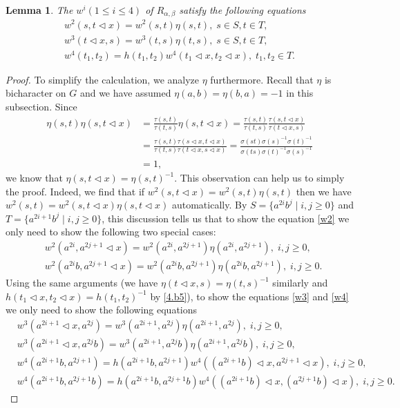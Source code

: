\documentclass[a4paper,11pt]{amsart}
\numberwithin{equation}{section}
\newtheorem{lemma}[theorem]{Lemma}
\begin{document}
\begin{lemma}\label{lemm4.3}
The $w^i (1\leq i \leq4)$ of $R_{\alpha,\beta}$ satisfy the following equations
\begin{gather}
\label{w2} w^2(s,t\triangleleft x)=w^2(s,t)\eta(s,t),\; s \in S,t\in T,\\
\label{w3} w^3(t\triangleleft x,s)=w^3(t,s)\eta(t,s),\;s \in S,t\in T,\\
\label{w4} w^4(t_1,t_2)=h(t_1,t_2)w^4(t_1 \triangleleft x,t_2 \triangleleft x),\;t_1,t_2 \in T.
\end{gather}
\end{lemma}
\begin{proof}
To simplify the calculation, we analyze $\eta$ furthermore. Recall that $\eta$ is bicharacter on $G$ and we have assumed $\eta(a,b)=\eta(b,a)=-1$ in this subsection. Since
\begin{align*}
\eta(s,t)\eta(s,t\triangleleft x)&=\frac{\tau(s,t)}{\tau(t,s)}\eta(s,t\triangleleft x)=\frac{\tau(s,t)}{\tau(t,s)} \frac{\tau(s,t\triangleleft x)}{\tau(t\triangleleft x,s)}\\
&=\frac{\tau(s,t) \tau(s\triangleleft x,t\triangleleft x)}{\tau(t,s) \tau(t\triangleleft x,s \triangleleft x)}=\frac{\sigma(st) \sigma(s)^{-1} \sigma(t)^{-1}}{\sigma(ts) \sigma(t)^{-1} \sigma(s)^{-1}}\\
&=1,
\end{align*}
we know that $\eta(s,t\triangleleft x)=\eta(s,t)^{-1}$.
This observation can help us to simply the proof. Indeed, we find that if $w^2(s,t\triangleleft x)=w^2(s,t)\eta(s,t)$ then we have $w^2(s,t)=w^2(s,t\triangleleft x)\eta(s,t\triangleleft x)$ automatically. By $S=\{a^{2i}b^j\;|\;i,j\geq 0\}$ and $T=\{a^{2i+1}b^j\;|\;i,j\geq 0\}$, this discussion tells us that to show the equation \eqref{w2} we only need to show the following two special cases:
\begin{align}
\label{w2.1} &w^2(a^{2i},a^{2j+1}\triangleleft x)=w^2(a^{2i},a^{2j+1})\eta(a^{2i},a^{2j+1}),\; i,j\geq 0,\\
\label{w2.2} &w^2(a^{2i}b,a^{2j+1}\triangleleft x)=w^2(a^{2i}b,a^{2j+1})\eta(a^{2i}b,a^{2j+1}),\; i,j\geq 0.
\end{align} Using the same arguments (we have $\eta(t\triangleleft x,s)=\eta(t,s)^{-1}$ similarly and $h(t_1\triangleleft x, t_2\triangleleft x)=h(t_1,t_2)^{-1}$ by \eqref{4.b5}), to show the equations \eqref{w3} and \eqref{w4} we only need to show the following equations
\begin{align}
\label{w3.1} &w^3(a^{2i+1}\triangleleft x,a^{2j})=w^3(a^{2i+1},a^{2j})\eta(a^{2i+1},a^{2j}),\;i,j\geq 0,\\
\label{w3.2} &w^3(a^{2i+1}\triangleleft x,a^{2j}b)=w^3(a^{2i+1},a^{2j}b)\eta(a^{2i+1},a^{2j}b),\;i,j\geq 0,\\
\label{w4.1} &w^4(a^{2i+1}b,a^{2j+1})=h(a^{2i+1}b,a^{2j+1})w^4((a^{2i+1}b) \triangleleft x,a^{2j+1} \triangleleft x),\;i,j\geq 0,\\
\label{w4.2} &w^4(a^{2i+1}b,a^{2j+1}b)=h(a^{2i+1}b,a^{2j+1}b)w^4((a^{2i+1}b) \triangleleft x,(a^{2j+1}b) \triangleleft x),\;i,j\geq 0.
\end{align}


\end{proof}
\end{document}
